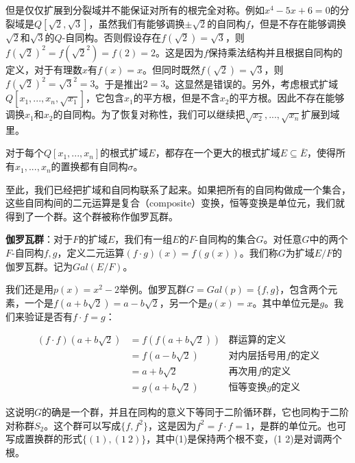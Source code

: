 \documentclass[b5paper]{ctexart}
\begin{document}
但是仅仅扩展到分裂域并不能保证对所有的根完全对称。例如$x^4 - 5x + 6 = 0$的分裂域是$Q[\sqrt{2}, \sqrt{3}]$，虽然我们有能够调换$\pm \sqrt{2}$的自同构$f$，但是不存在能够调换$\sqrt{2}$和$\sqrt{3}$的$Q$-自同构。否则假设存在$f(\sqrt{2}) = \sqrt{3}$，则$f(\sqrt{2})^2 = f(\sqrt{2}^2) = f(2) = 2$。这是因为$f$保持乘法结构并且根据自同构的定义，对于有理数$x$有$f(x) = x$。但同时既然$f(\sqrt{2}) = \sqrt{3}$，则$f(\sqrt{2})^2 = \sqrt{3}^2 = 3$。于是推出$2 = 3$。这显然是错误的。另外，考虑根式扩域$Q[x_1, ..., x_n, \sqrt{x_1}]$，它包含$x_1$的平方根，但是不含$x_2$的平方根。因此不存在能够调换$x_1$和$x_2$的自同构。为了恢复对称性，我们可以继续把$\sqrt{x_2}, ..., \sqrt{x_n}$扩展到域里。

\begin{theorem}
对于每个$Q[x_1, ..., x_n]$的根式扩域$E$，都存在一个更大的根式扩域$E \subseteq \overline{E}$，使得所有$x_1, ..., x_n$的置换都有自同构$\sigma$。
\end{theorem}

至此，我们已经把扩域和自同构联系了起来。如果把所有的自同构做成一个集合，这些自同构间的二元运算是复合（composite）变换，恒等变换是单位元，我们就得到了一个群。这个群被称作伽罗瓦群。

\begin{definition}
\textbf{伽罗瓦群}：对于$F$的扩域$E$，我们有一组$E$的$F$-自同构的集合$G$。对任意$G$中的两个$F$-自同构$f, g$，定义二元运算$(f \cdot g)(x) = f(g(x))$。我们称$G$为扩域$E/F$的伽罗瓦群。记为$Gal(E/F)$。
\end{definition}

我们还是用$p(x) = x^2 - 2$举例。伽罗瓦群$G = Gal(p) = \{f, g\}$，包含两个元素，一个是$f(a + b\sqrt{2}) = a - b\sqrt{2}$，另一个是$g(x) = x$。其中单位元是$g$。我们来验证是否有$f \cdot f = g$：

\[
\begin{array}{rll}
(f \cdot f)(a + b\sqrt{2}) & = f(f(a + b\sqrt{2})) & \text{群运算的定义} \\
  & = f(a - b\sqrt{2}) & \text{对内层括号用$f$的定义} \\
  & = a + b\sqrt{2} & \text{再次用$f$的定义} \\
  & = g(a + b\sqrt{2}) & \text{恒等变换$g$的定义}
\end{array}
\]

这说明$G$的确是一个群，并且在同构的意义下等同于二阶循环群，它也同构于二阶对称群$S_2$。这个群可以写成$\{f, f^2\}$，这是因为$f^2 = f \cdot f = 1$，是群的单位元。也可写成置换群的形式$\{(1), (1\ 2)\}$，其中(1)是保持两个根不变，(1 2)是对调两个根。
\end{document}
